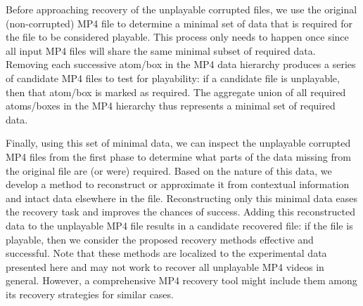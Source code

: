 Before approaching recovery of the unplayable corrupted files, we use the original (non-corrupted) MP4 file to determine a minimal set of data that is required for the file to be considered playable. This process only needs to happen once since all input MP4 files will share the same minimal subset of required data. Removing each successive atom/box in the MP4 data hierarchy produces a series of candidate MP4 files to test for playability: if a candidate file is unplayable, then that atom/box is marked as required. The aggregate union of all required atoms/boxes in the MP4 hierarchy thus represents a minimal set of required data.

Finally, using this set of minimal data, we can inspect the unplayable corrupted MP4 files from the first phase to determine what parts of the data missing from the original file are (or were) required. Based on the nature of this data, we develop a method to reconstruct or approximate it from contextual information and intact data elsewhere in the file. Reconstructing only this minimal data eases the recovery task and improves the chances of success. Adding this reconstructed data to the unplayable MP4 file results in a candidate recovered file: if the file is playable, then we consider the proposed recovery methods effective and successful. Note that these methods are localized to the experimental data presented here and may not work to recover all unplayable MP4 videos in general. However, a comprehensive MP4 recovery tool might include them among its recovery strategies for similar cases.